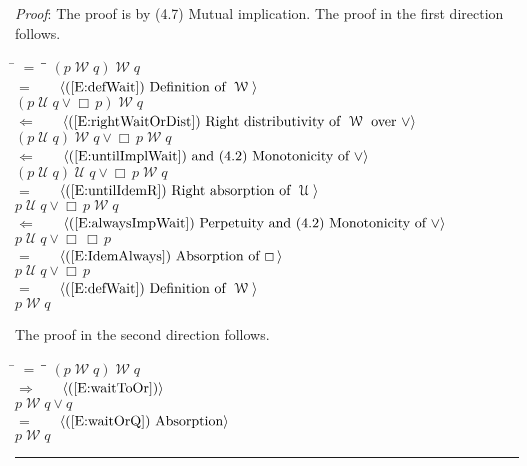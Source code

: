 \documentclass[12pt, fleqn, leqno]{article}
\newcommand{\lgap}{2pt}                             %
\newcommand{\mymathindent}{24pt}                    %
\newcommand{\impl}{\ensuremath{\Rightarrow}}        %
\newcommand{\foll}{\ensuremath{\Leftarrow}}         %
\newcommand{\Until}{\;\mathcal{U}\;}
\newcommand{\Wait}{\;\mathcal{W}\;}
\newcommand{\Always}{\Box\,}
\newcommand{\myqed}{\rule[-.23ex]{1.2ex}{2.0ex}}
\newcommand{\myqedtab}{\hspace{384pt}}              %
\newcommand{\Gll} {\langle}                         %
\newcommand{\Ggg} {\rangle}                         %
\newcommand{\Hint}[1]     {\ \ \ $\Gll              \mbox{#1} \Ggg$ }   %
\begin{document}
\emph{Proof}: The proof is by (4.7) Mutual implication.
The proof in the first direction follows.
\begin{tabbing}
\hspace{\mymathindent} \= $= \;$ \= \myqedtab \= \kill
  \> \>   $(p \Wait q)\Wait q$\\[\lgap]
  \> $=$  \>  \Hint{(\ref{E:defWait}) Definition of $\Wait$}\\[\lgap]
  \> \>   $(p \Until q\lor \Always p)\Wait q$\\[\lgap]
  \> $\foll$  \>  \Hint{(\ref{E:rightWaitOrDist}) Right distributivity of $\Wait$ over $\lor$}\\[\lgap]
  \> \>   $(p \Until q)\Wait q \lor \Always p\Wait q$\\[\lgap]
  \> $\foll$  \>  \Hint{(\ref{E:untilImplWait}) and (4.2) Monotonicity of $\lor$}\\[\lgap]
  \> \>   $(p \Until q)\Until q \lor \Always p\Wait q$\\[\lgap]
  \> $=$  \>  \Hint{(\ref{E:untilIdemR}) Right absorption of $\Until$}\\[\lgap]
  \> \>   $p \Until q \lor \Always p\Wait q$\\[\lgap]
  \> $\foll$  \>  \Hint{(\ref{E:alwaysImpWait}) Perpetuity and (4.2) Monotonicity of $\lor$}\\[\lgap]
  \> \>   $p \Until q \lor \Always \Always p$\\[\lgap]
  \> $=$  \>  \Hint{(\ref{E:IdemAlways}) Absorption of $\Always$}\\[\lgap]
  \> \>   $p \Until q \lor \Always p$\\[\lgap]
  \> $=$  \>  \Hint{(\ref{E:defWait}) Definition of $\Wait$}\\[\lgap]
  \> \>   $p \Wait q$
\end{tabbing}
The proof in the second direction follows.
\begin{tabbing}
\hspace{\mymathindent} \= $= \;$ \= \myqedtab \= \kill
  \> \>   $(p \Wait q) \Wait q$\\[\lgap]
  \> $\impl$  \>  \Hint{(\ref{E:waitToOr})}\\[\lgap]
  \> \>   $p \Wait q \lor q$\\[\lgap]
  \> $=$  \>  \Hint{(\ref{E:waitOrQ}) Absorption}\\[\lgap]
  \> \>   $p \Wait q$ \quad \myqed
\end{tabbing}
\end{document}
